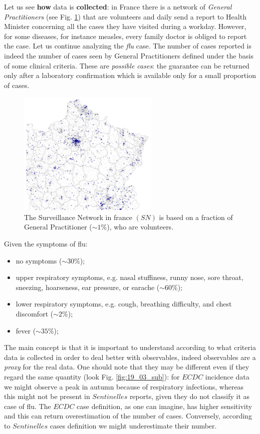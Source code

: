 \documentclass[../main/main.tex]{subfiles}
\begin{document}
Let us see \textbf{how} data is \textbf{collected}: in France there is a network of \textit{General Practitioners} (see Fig. \ref{fig:19_04}) that are volunteers and daily send a report to Health Minister concerning all the cases they have visited during a workday. However, for some diseases, for instance measles, every family doctor is obliged to report the case. Let us continue analyzing the \textit{flu} case. The number of cases reported is indeed the number of cases seen by General Practitioners defined under the basis of some clinical criteria. These are \textit{possible cases}: the guarantee can be returned only after a laboratory confirmation which is available only for a small proportion of cases.

\begin{figure}[h!]
\centering
\includegraphics[width=0.6\textwidth]{../lessons/image/19/image04.png}
\caption{\label{fig:19_04} The Surveillance Network in france $(SN)$ is based on a fraction of General Practitioner ($\sim1\%$), who are volunteers.}
\end{figure}

Given the symptoms of flu:
\begin{itemize}
\item no symptoms (\( \sim 30 \% \));
\item upper respiratory symptoms, e.g. nasal stuffiness, runny nose, sore throat, sneezing, hoarseness, ear pressure, or earache (\( \sim 60 \% \));
\item lower respiratory symptoms, e.g. cough, breathing difficulty, and chest discomfort (\( \sim 2 \% \));
\item fever (\( \sim 35 \% \));
\end{itemize}
The main concept is that it is important to understand according to what criteria data is collected in order to deal better with observables, indeed observables are a \textit{proxy} for the real data.
One should note that they may be different even if they regard the same quantity (look Fig. \ref{fig:19_03_sub}): for $ECDC$ incidence data we might observe a peak in autumn because of respiratory infections, whereas this might not be present in $Sentinelles$ reports, given they do not classify it as case of flu. The $ECDC$ case definition, as one can imagine, has higher sensitivity and this can return overestimation of the number of cases. Conversely, according to $Sentinelles$ cases definition we might underestimate their number.
\end{document}
